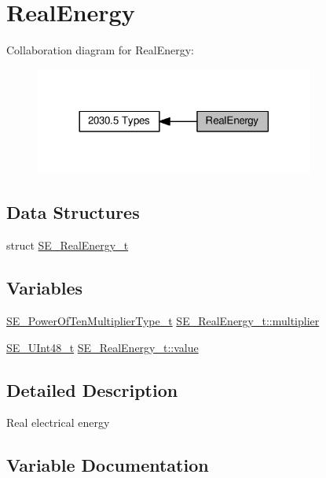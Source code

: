 \hypertarget{group__RealEnergy}{}\section{Real\+Energy}
\label{group__RealEnergy}
Collaboration diagram for Real\+Energy\+:\nopagebreak
\begin{figure}[H]
\begin{center}
\leavevmode
\includegraphics[width=260pt]{group__RealEnergy}
\end{center}
\end{figure}
\subsection*{Data Structures}
\begin{DoxyCompactItemize}
\item 
struct \hyperlink{structSE__RealEnergy__t}{S\+E\+\_\+\+Real\+Energy\+\_\+t}
\end{DoxyCompactItemize}
\subsection*{Variables}
\begin{DoxyCompactItemize}
\item 
\hyperlink{group__PowerOfTenMultiplierType_gaf0317b781dc8dbb9cb6ac4e44a14fdef}{S\+E\+\_\+\+Power\+Of\+Ten\+Multiplier\+Type\+\_\+t} \hyperlink{group__RealEnergy_gab9ca1391c8d23c03e421ed0b974896f2}{S\+E\+\_\+\+Real\+Energy\+\_\+t\+::multiplier}
\item 
\hyperlink{group__UInt48_gaa15d726fc29126d24b991437334d77a0}{S\+E\+\_\+\+U\+Int48\+\_\+t} \hyperlink{group__RealEnergy_ga9995a7c4d5cf5ad6283eea0d8b343426}{S\+E\+\_\+\+Real\+Energy\+\_\+t\+::value}
\end{DoxyCompactItemize}


\subsection{Detailed Description}
Real electrical energy 

\subsection{Variable Documentation}
\mbox{\label{group__RealEnergy_gab9ca1391c8d23c03e421ed0b974896f2}} 
